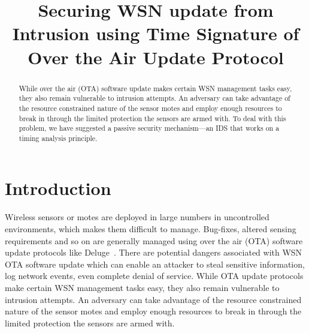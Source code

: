 \documentclass[conference]{IEEEtran}
\begin{document}
\title{Securing WSN update from Intrusion using Time Signature of Over the Air Update Protocol}

\author{
		}


\maketitle

\begin{abstract}
While over the air (OTA) software update makes certain WSN management tasks easy, they also remain vulnerable to intrusion attempts.
An adversary can take advantage of the resource constrained nature of the sensor motes and employ enough resources to break in through the limited protection the sensors are armed with.
To deal with this problem, we have suggested a passive security mechanism---an IDS that works on a timing analysis principle.
\end{abstract}

\section{Introduction}
\label{sec:intro}

Wireless sensors or motes are deployed in large numbers in uncontrolled environments, which makes them difficult to manage.
Bug-fixes, altered sensing requirements and so on are generally managed using over the air (OTA) software update protocols like Deluge~\cite{1031506}.
There are potential dangers associated with WSN OTA software update which can enable an attacker to steal sensitive information, log network events, even complete denial of service.
While OTA update protocols make certain WSN management tasks easy, they also remain vulnerable to intrusion attempts.
An adversary can take advantage of the resource constrained nature of the sensor motes and employ enough resources to break in through the limited protection the sensors are armed with.
\end{document}
